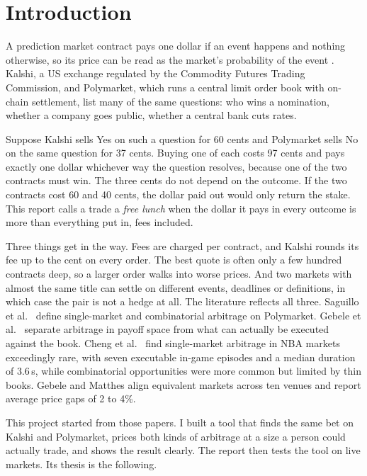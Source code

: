 \documentclass[5p,letterpaper]{elsarticle}
\begin{document}
\section{Introduction}

A prediction market contract pays one dollar if an event happens and nothing otherwise, so its price can be read as the market's probability of the event \cite{wolfers2004}. Kalshi, a US exchange regulated by the Commodity Futures Trading Commission, and Polymarket, which runs a central limit order book with on-chain settlement, list many of the same questions: who wins a nomination, whether a company goes public, whether a central bank cuts rates.

Suppose Kalshi sells Yes on such a question for 60 cents and Polymarket sells No on the same question for 37 cents. Buying one of each costs 97 cents and pays exactly one dollar whichever way the question resolves, because one of the two contracts must win. The three cents do not depend on the outcome. If the two contracts cost 60 and 40 cents, the dollar paid out would only return the stake. This report calls a trade a \emph{free lunch} when the dollar it pays in every outcome is more than everything put in, fees included.

Three things get in the way. Fees are charged per contract, and Kalshi rounds its fee up to the cent on every order. The best quote is often only a few hundred contracts deep, so a larger order walks into worse prices. And two markets with almost the same title can settle on different events, deadlines or definitions, in which case the pair is not a hedge at all. The literature reflects all three. Saguillo et al.\ \cite{saguillo2025} define single-market and combinatorial arbitrage on Polymarket. Gebele et al.\ \cite{gebele2026executable} separate arbitrage in payoff space from what can actually be executed against the book. Cheng et al.\ \cite{cheng2026} find single-market arbitrage in NBA markets exceedingly rare, with seven executable in-game episodes and a median duration of 3.6\,s, while combinatorial opportunities were more common but limited by thin books. Gebele and Matthes \cite{gebele2026semantic} align equivalent markets across ten venues and report average price gaps of 2 to 4\%.

This project started from those papers. I built a tool that finds the same bet on Kalshi and Polymarket, prices both kinds of arbitrage at a size a person could actually trade, and shows the result clearly. The report then tests the tool on live markets. Its thesis is the following.
\end{document}
